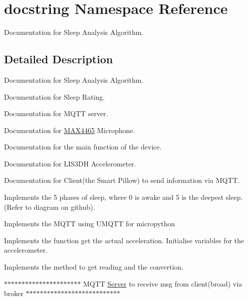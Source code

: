 \hypertarget{namespacedocstring}{}\section{docstring Namespace Reference}
\label{namespacedocstring}


Documentation for Sleep Analysis Algorithm.  




\subsection{Detailed Description}
Documentation for Sleep Analysis Algorithm. 

Documentation for Sleep Rating.

Documentation for M\+Q\+TT server.

Documentation for \mbox{\hyperlink{namespace_m_a_x4465}{M\+A\+X4465}} Microphone.

Documentation for the main function of the device.

Documentation for L\+I\+S3\+DH Accelerometer.

Documentation for Client(the Smart Pillow) to send information via M\+Q\+TT.

Implements the 5 phases of sleep, where 0 is awake and 5 is the deepest sleep. (Refer to diagram on github).

Implements the M\+Q\+TT using U\+M\+Q\+TT for micropython

Implements the function get the actual acceleration. Initialise variables for the accelerometer.

Implements the method to get reading and the convertion.

\textquotesingle{}\textquotesingle{}\textquotesingle{}$\ast$$\ast$$\ast$$\ast$$\ast$$\ast$$\ast$$\ast$$\ast$$\ast$$\ast$$\ast$$\ast$$\ast$$\ast$$\ast$$\ast$$\ast$$\ast$$\ast$$\ast$$\ast$ M\+Q\+TT \mbox{\hyperlink{namespace_server}{Server}} to receive msg from client(broad) via broker $\ast$$\ast$$\ast$$\ast$$\ast$$\ast$$\ast$$\ast$$\ast$$\ast$$\ast$$\ast$$\ast$$\ast$$\ast$$\ast$$\ast$$\ast$$\ast$$\ast$$\ast$$\ast$$\ast$$\ast$$\ast$$\ast$$\ast$\textquotesingle{}\textquotesingle{}\textquotesingle{} 